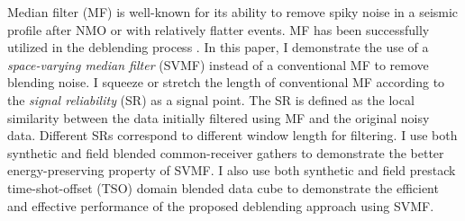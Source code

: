 
Median filter (MF) is well-known for its ability to remove spiky noise in a seismic profile after NMO or with relatively flatter events. MF has been successfully utilized in the deblending process \cite[]{mediandeblend,araz2012}. In this paper, I demonstrate the use of a \emph{space-varying median filter} (SVMF) instead of a conventional MF to remove blending noise. I squeeze or stretch the length of conventional MF according to the \emph{signal reliability} (SR) as a signal point. The SR is defined as the local similarity between the data initially filtered using MF and the original noisy data. Different SRs correspond to different window length for filtering. %
I use both synthetic and field blended common-receiver gathers to demonstrate the better energy-preserving property of SVMF. I also use both synthetic and field prestack time-shot-offset (TSO) domain blended data cube to demonstrate the efficient and effective performance of the proposed deblending approach using SVMF.

